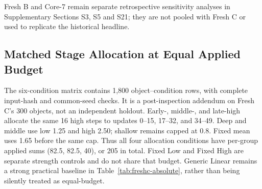 \documentclass[times,twocolumn,final]{elsarticle}
\providecommand{\DIFadd}[1]{{\protect\color{blue} \sf #1}} %
\providecommand{\DIFaddbegin}{} %
\providecommand{\DIFaddend}{} %
\begin{document}
  \DIFaddbegin \DIFadd{Fresh B and Core-7 remain separate retrospective sensitivity analyses in Supplementary Sections S3, S5 }\DIFaddend and   \DIFaddbegin \DIFadd{S21; they are not pooled with Fresh C or used to replicate the historical headline.
}

\subsection{Matched Stage Allocation at Equal Applied Budget}
\label{subsec:matched-budget300}
\DIFadd{The six-condition matrix contains 1,800 object--condition rows, with complete input-hash }\DIFaddend and   \DIFaddbegin \DIFadd{common-seed checks. It is a post-inspection addendum on Fresh C's 300 objects, not an independent holdout. Early-, middle-, and late-high allocate the same 16 high steps to updates 0--15, 17--32, and 34--49. Deep and middle use low 1.25 and high 2.50; shallow remains capped at 0.8. Fixed mean uses 1.65 before the same cap. Thus all four allocation conditions have per-group applied sums (82.5, 82.5, 40), or 205 in total. Fixed Low and Fixed High are separate strength controls and do not share that budget. Generic Linear remains a strong practical baseline in Table~\ref{tab:freshc-absolute}, rather than being silently treated as equal-budget}\DIFaddend .
\end{document}
